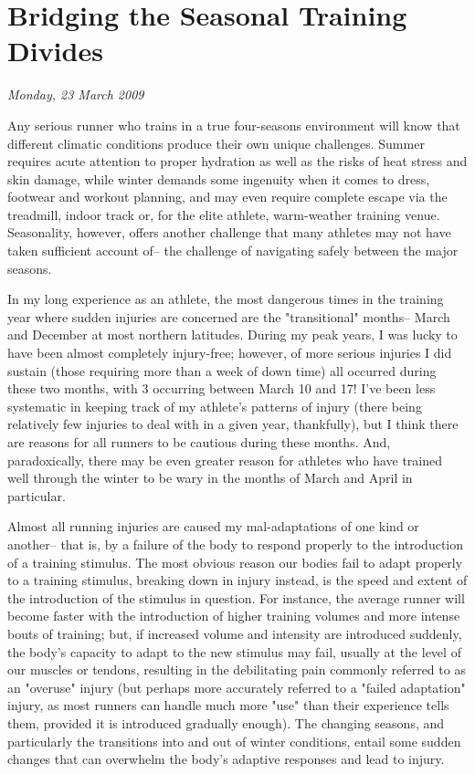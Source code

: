 \chapter{Bridging the Seasonal Training Divides}
\textit{Monday, 23 March 2009}
\bigskip

Any serious runner who trains in a true four-seasons environment will know that different climatic conditions produce their own unique challenges. Summer requires acute attention to proper hydration as well as the risks of heat stress and skin damage, while winter demands some ingenuity when it comes to dress, footwear and workout planning, and may even require complete escape via the treadmill, indoor track or, for the elite athlete, warm-weather training venue. Seasonality, however, offers another challenge that many athletes may not have taken sufficient account of-- the challenge of navigating safely between the major seasons.

In my long experience as an athlete, the most dangerous times in the training year where sudden injuries are concerned are the "transitional" months-- March and December at most northern latitudes. During my peak years, I was lucky to have been almost completely injury-free; however, of more serious injuries I did sustain (those requiring more than a week of down time) all occurred during these two months, with 3 occurring between March 10 and 17! I've been less systematic in keeping track of my athlete's patterns of injury (there being relatively few injuries to deal with in a given year, thankfully), but I think there are reasons for all runners to be cautious during these months. And, paradoxically, there may be even greater reason for athletes who have trained well through the winter to be wary in the months of March and April in particular.

Almost all running injuries are caused my mal-adaptations of one kind or another-- that is, by a failure of the body to respond properly to the introduction of a training stimulus. The most obvious reason our bodies fail to adapt properly to a training stimulus, breaking down in injury instead, is the speed and extent of the introduction of the stimulus in question. For instance, the average runner will become faster with the introduction of higher training volumes and more intense bouts of training; but, if increased volume and intensity are introduced suddenly, the body's capacity to adapt to the new stimulus may fail, usually at the level of our muscles or tendons, resulting in the debilitating pain commonly referred to as an "overuse" injury (but perhaps more accurately referred to a "failed adaptation" injury, as most runners can handle much more "use" than their experience tells them, provided it is introduced gradually enough). The changing seasons, and particularly the transitions into and out of winter conditions, entail some sudden changes that can overwhelm the body's adaptive responses and lead to injury.

